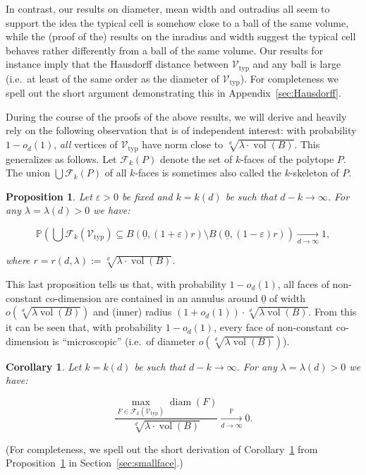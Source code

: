 \documentclass[11pt]{article}%
\newtheorem{corollary} [theorem] {Corollary}%
\newtheorem{proposition} [theorem] {Proposition}%
\newcommand{\Fcal}[0]{\ensuremath{{\mathcal F}}}
\newcommand{\Vcal}[0]{\ensuremath{{\mathcal V}}}
\newcommand{\Pee}[0]{\ensuremath{{\mathbb P}}}
\newcommand{\eps}{\varepsilon}
\newcommand{\orig}{\underline{0}}
\DeclareMathOperator{\vol}{vol}
\DeclareMathOperator{\diam}{diam}
\newcommand{\Vtyp}[0]{\Vcal_{\text{typ}}}
\begin{document}
In contrast, our results on diameter, mean width and outradius all seem to support the idea the typical cell is somehow close to 
a ball of the same volume, while the (proof of the) results on the inradius and width 
suggest the typical cell behaves rather differently from a ball of the same volume. 
Our results for instance imply that the Hausdorff distance between $\Vtyp$ and any ball is large (i.e.~at least 
of the same order as the diameter of $\Vtyp$). 
For completeness we spell out the short argument demonstrating this in Appendix~\ref{sec:Hausdorff}.

During the course of the proofs of the above results, we will derive and heavily rely on 
the following observation that is of independent interest: 
with probability $1-o_d(1)$, {\em all} vertices of $\Vtyp$ have norm 
close to $\sqrt[d]{\lambda\cdot\vol(B)}$.
This generalizes as follows. Let $\Fcal_k(P)$ denote the set of $k$-faces of the polytope $P$.
The union $\bigcup \Fcal_k(P)$ of all $k$-faces is sometimes also called the $k$-skeleton of $P$.

\begin{proposition}\label{prop:radiussmallface}
Let $\eps>0$ be fixed and $k=k(d)$ be such that $d-k\to \infty$.
For any $\lambda=\lambda(d)>0$ we have:

$$ \Pee\left( \bigcup \Fcal_k(\Vtyp) \subseteq B(\orig,(1+\eps)r)
\setminus B(\orig,(1-\eps)r) \right) 
\xrightarrow[d\to\infty]{} 1, $$

\noindent
where $r = r(d,\lambda) := \sqrt[d]{\lambda\cdot\vol(B)}$.
\end{proposition}

This last proposition tells us that, with probability $1-o_d(1)$, all faces of non-constant co-dimension 
are contained in an annulus around $\orig$ of width $o\left( \sqrt[d]{\lambda \vol(B)} \right)$ and 
(inner) radius $(1+o_d(1)) \cdot \sqrt[d]{\lambda \vol(B)}$.
From this it can be seen that, with probability $1-o_d(1)$, every face of non-constant co-dimension
is ``microscopic'' (i.e.~of diameter $o\left( \sqrt[d]{\lambda \vol(B)} \right)$).

\begin{corollary}\label{cor:diamsmallface}
 Let $k=k(d)$ be such that $d-k\to \infty$.
For any $\lambda=\lambda(d)>0$ we have:

$$ \frac{\max_{F \in \Fcal_k(\Vtyp)} \diam(F)}{\sqrt[d]{\lambda\cdot\vol(B)}} 
\xrightarrow[d\to\infty]{\Pee} 0.
$$ 
\end{corollary}

\noindent
(For completeness, we spell out the short derivation of Corollary~\ref{cor:diamsmallface} from 
Proposition~\ref{prop:radiussmallface} in Section~\ref{sec:smallface}.)
\end{document}
